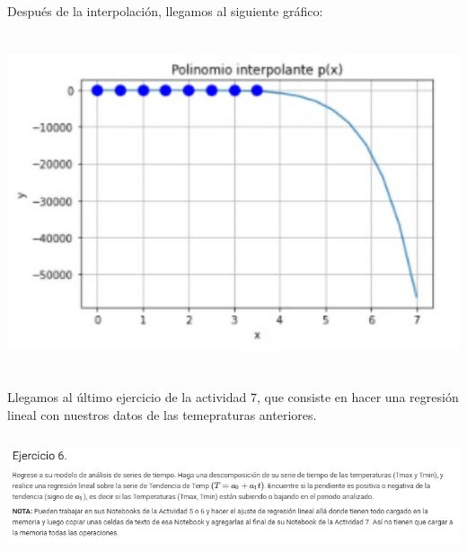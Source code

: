 \documentclass[12pt]{article}
\begin{document}
Después de la interpolación, llegamos al siguiente gráfico:

    \begin{center}
	\includegraphics[height=10cm]{5.4.jpeg}\\
    \end{center}
    
Llegamos al último ejercicio de la actividad 7, que consiste en hacer una regresión lineal con nuestros datos de las temepraturas anteriores.

    \begin{center}
	\includegraphics[height=3.5cm]{E6.jpeg}\\
    \end{center}
    
\end{document}
